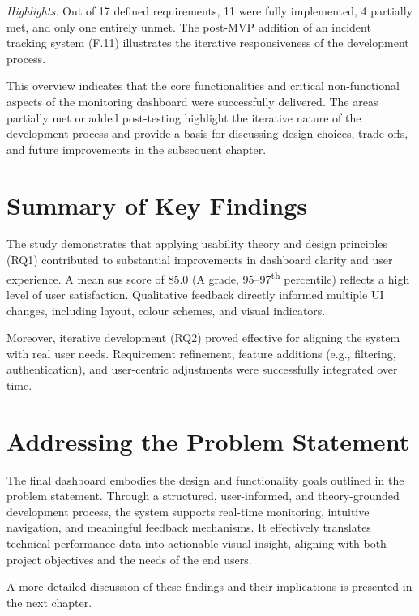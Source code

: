 \textit{Highlights:} Out of 17 defined requirements, 11 were fully implemented, 4 partially met, and only one entirely unmet. The post-MVP addition of an incident tracking system (F.11) illustrates the iterative responsiveness of the development process.

This overview indicates that the core functionalities and critical non-functional aspects of the monitoring dashboard were successfully delivered. The areas partially met or added post-testing highlight the iterative nature of the development process and provide a basis for discussing design choices, trade-offs, and future improvements in the subsequent chapter.

\section{Summary of Key Findings}
The study demonstrates that applying usability theory and design principles (RQ1) contributed to substantial improvements in dashboard clarity and user experience. A mean \acrshort{sus} score of 85.0 (A grade, 95–97\textsuperscript{th} percentile) reflects a high level of user satisfaction. Qualitative feedback directly informed multiple UI changes, including layout, colour schemes, and visual indicators.

Moreover, iterative development (RQ2) proved effective for aligning the system with real user needs. Requirement refinement, feature additions (e.g., filtering, authentication), and user-centric adjustments were successfully integrated over time.

\section{Addressing the Problem Statement}
The final dashboard embodies the design and functionality goals outlined in the problem statement. Through a structured, user-informed, and theory-grounded development process, the system supports real-time monitoring, intuitive navigation, and meaningful feedback mechanisms. It effectively translates technical performance data into actionable visual insight, aligning with both project objectives and the needs of the end users.

A more detailed discussion of these findings and their implications is presented in the next chapter.
